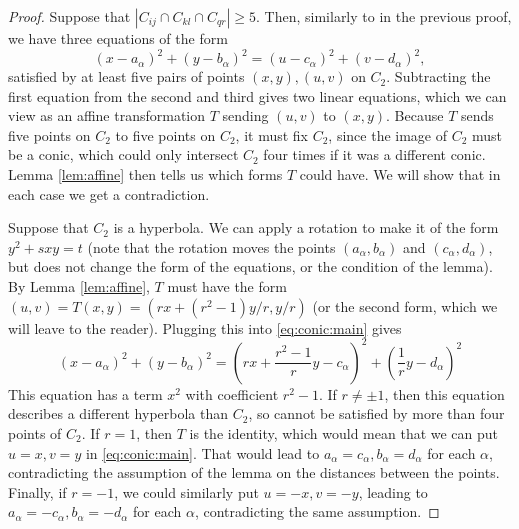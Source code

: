 \documentclass[12pt]{article}
\begin{document}
\begin{proof}
 Suppose that $|C_{ij}\cap C_{kl} \cap C_{qr}|\geq 5$.
 Then, similarly to in the previous proof, 
 we have three equations of the form
 \begin{equation}\label{eq:conic:main}
  (x-a_\alpha)^2 + (y-b_\alpha)^2  = (u-c_\alpha)^2 + (v-d_\alpha)^2,
 \end{equation}
 satisfied by at least five pairs of points $(x,y), (u,v)$ on $C_2$. 
 Subtracting the first equation from the second and third gives two linear equations,
 which we can view as an affine transformation $T$ sending $(u,v)$ to $(x,y)$.
 Because $T$ sends five points on $C_2$ to five points on $C_2$,
 it must fix $C_2$, since the image of $C_2$ must be a conic, 
 which could only intersect $C_2$ four times if it was a different conic.   
 Lemma \ref{lem:affine} then tells us which forms $T$ could have.
 We will show that in each case we get a contradiction.
   
 Suppose that $C_2$ is a hyperbola.
 We can apply a rotation to make it of the form $y^2 + s xy = t$
 (note that the rotation moves the points $(a_\alpha,b_\alpha)$ and $(c_\alpha,d_\alpha)$, 
 but does not change the form of the equations, or the condition of the lemma).
 By Lemma \ref{lem:affine}, $T$ must have the form 
 $(u,v) = T(x,y) = (rx+(r^2-1)y/r, y/r)$ 
 (or the second form, which we will leave to the reader). 
 Plugging this into \eqref{eq:conic:main} gives
 $$(x-a_\alpha)^2 + (y-b_\alpha)^2 = \left(rx+\frac{r^2-1}{r}y-c_\alpha\right)^2 
 + \left(\frac{1}{r}y-d_\alpha\right)^2$$
 This equation has a term $x^2$ with coefficient $r^2-1$.
 If $r\neq \pm1$, then this equation describes a different hyperbola than $C_2$,
 so cannot be satisfied by more than four points of $C_2$.   
 If $r=1$, then $T$ is the identity, 
 which would mean that we can put $u = x, v = y$ in \eqref{eq:conic:main}. 
 That would lead to $a_\alpha = c_\alpha,b_\alpha = d_\alpha$ for each $\alpha$, 
 contradicting the assumption of the lemma on the distances between the points.
 Finally, if $r = -1$, we could similarly put $u = -x, v = -y$, 
 leading to $a_\alpha = -c_\alpha,b_\alpha = -d_\alpha$ for each $\alpha$, 
 contradicting the same assumption.
   

\end{proof}
\end{document}
